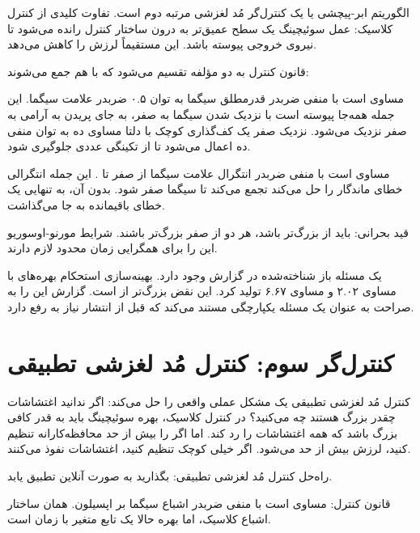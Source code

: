 \documentclass[12pt, a4paper]{article}
\newcommand{\dash}{\lr{---}}
\begin{document}
الگوريتم ابر-پيچشی يا  يک کنترل‌گر مُد لغزشی مرتبه دوم است. تفاوت کليدی از کنترل کلاسيک: عمل سوئيچينگ يک سطح عميق‌تر به درون ساختار کنترل رانده می‌شود تا نيروی خروجی  پيوسته باشد. اين مستقيماً لرزش را کاهش می‌دهد.

قانون کنترل به دو مؤلفه تقسيم می‌شود که با هم جمع می‌شوند:

\begin{center}
\mbox{}
\end{center}

 مساوی است با منفی  ضربدر قدرمطلق سيگما به توان ۰.۵ ضربدر علامت سيگما. اين جمله همه‌جا پيوسته است \dash{} با نزديک شدن سيگما به صفر،  به جای پريدن به آرامی به صفر نزديک می‌شود. نزديک صفر يک کف‌گذاری کوچک با دلتا مساوی ده به توان منفی ده اعمال می‌شود تا از تکينگی عددی جلوگيری شود.

 مساوی است با منفی  ضربدر انتگرال علامت سيگما از صفر تا . اين جمله انتگرالی خطای ماندگار را حل می‌کند \dash{} تجمع می‌کند تا سيگما صفر شود. بدون آن،  به تنهايی يک خطای باقيمانده به جا می‌گذاشت.

قيد بحرانی:  بايد از  بزرگ‌تر باشد، هر دو از صفر بزرگ‌تر باشند. شرايط مورنو-اوسوريو اين را برای همگرايی زمان محدود لازم دارند.

يک مسئله باز شناخته‌شده در گزارش وجود دارد. بهينه‌سازی استحکام بهره‌های  با  مساوی ۲.۰۲ و  مساوی ۶.۶۷ توليد کرد. اين نقض  بزرگ‌تر از  است. گزارش اين را به صراحت به عنوان يک مسئله يکپارچگی مستند می‌کند که قبل از انتشار نياز به رفع دارد.

\section{کنترل‌گر سوم: کنترل مُد لغزشی تطبيقی}

کنترل مُد لغزشی تطبيقی يک مشکل عملی واقعی را حل می‌کند: اگر ندانيد اغتشاشات چقدر بزرگ هستند چه می‌کنيد؟ در کنترل کلاسيک، بهره سوئيچينگ  بايد به قدر کافی بزرگ باشد که همه اغتشاشات را رد کند. اما اگر  را بيش از حد محافظه‌کارانه تنظيم کنيد، لرزش بيش از حد می‌شود. اگر خيلی کوچک تنظيم کنيد، اغتشاشات نفوذ می‌کنند.

راه‌حل کنترل مُد لغزشی تطبيقی: بگذاريد  به صورت آنلاين تطبيق يابد.

قانون کنترل:  مساوی است با منفی  ضربدر اشباع سيگما بر اپسيلون. همان ساختار اشباع کلاسيک، اما بهره  حالا يک تابع متغير با زمان است.
\end{document}
